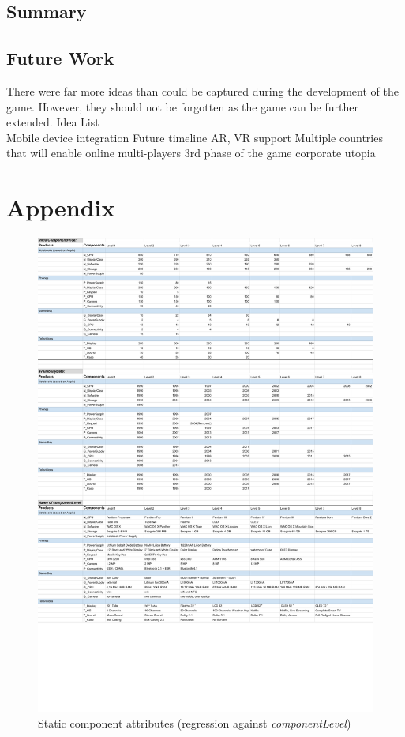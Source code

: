 \documentclass[11pt,titlepage,oneside,openany]{book}
\begin{document}
\section{Summary}
\label{sec:sum}

\section{Future Work}
\label{sec:future}
There were far more ideas than could be captured during the development of the game. However, they should not be forgotten as the game can be further extended. 
Idea List\\
Mobile device integration
Future timeline
AR, VR support
Multiple countries that will enable online multi-players
3rd phase of the game corporate utopia


\pagebreak
\appendix

\chapter{Appendix}
\label{cha:appendix-a}
\begin{figure}
    \centering
    \includegraphics[trim=0cm 5cm 0cm 0cm, scale = 0.75]{images/staticComponentAttributes.pdf}
    \caption{Static component attributes (regression against \textit{componentLevel})}
    \label{fig:staticComponentAttributes}
\end{figure}


\newpage


\pagestyle{empty}
\end{document}
